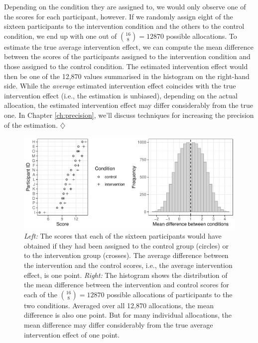 \documentclass[a4paper]{tufte-book}\usepackage[]{graphicx}\usepackage[]{xcolor}
\newcommand*{\parend}[1][$\diamondsuit$]{%
\leavevmode\unskip\penalty9999 \hbox{}\nobreak\hfill
    \quad\hbox{#1}%
}
\begin{document}
  Depending on the condition they are assigned to, 
  we would only observe one of the scores for each participant, however.
  If we randomly assign eight of the sixteen participants to the intervention
  condition and the others to the control condition,
  we end up with one out of ${16 \choose 8} = 12870$ possible allocations.
  To estimate the true average intervention effect,
  we can compute the mean difference between the scores of the participants
  assigned to the intervention condition and those assigned to the control condition.
  The estimated intervention effect would then be one of the 12,870
  values summarised in the histogram on the right-hand side.
  While the \emph{average} estimated intervention effect coincides with
  the true intervention effect (i.e., the estimation is unbiased),
  depending on the actual allocation, the estimated intervention effect
  may differ considerably from the true one.
  In Chapter \ref{ch:precision}, we'll discuss techniques for increasing the precision
  of the estimation.
\parend



\begin{figure}[tpbh]
  \centering
  \includegraphics[max width = \textwidth]{figure/estimation-1}
  \caption{\textit{Left:} The scores that each of the sixteen participants
  would have obtained if they had been assigned to the control group (circles)
  or to the intervention group (crosses). The average difference between
  the intervention and the control scores, i.e., the average intervention effect, 
  is one point. 
  \textit{Right:} The histogram shows the distribution of the mean difference
  between the intervention and control scores for each of the ${16 \choose 8} = 12870$
  possible allocations of participants to the two conditions.
  Averaged over all 12,870 allocations, the mean difference is also one point.
  But for many individual allocations, the mean difference may differ considerably
  from the true average intervention effect of one point.}
  \label{fig:estimation}
\end{figure}
\end{document}
